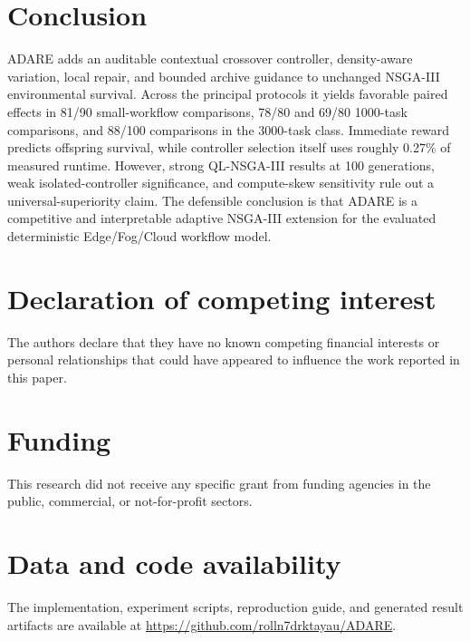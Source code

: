 \documentclass[preprint,12pt]{elsarticle}
\begin{document}
\section{Conclusion}
ADARE adds an auditable contextual crossover controller, density-aware variation, local repair, and bounded archive guidance to unchanged NSGA-III environmental survival. Across the principal protocols it yields favorable paired effects in 81/90 small-workflow comparisons, 78/80 and 69/80 1000-task comparisons, and 88/100 comparisons in the 3000-task class. Immediate reward predicts offspring survival, while controller selection itself uses roughly 0.27\% of measured runtime. However, strong QL-NSGA-III results at 100 generations, weak isolated-controller significance, and compute-skew sensitivity rule out a universal-superiority claim. The defensible conclusion is that ADARE is a competitive and interpretable adaptive NSGA-III extension for the evaluated deterministic Edge/Fog/Cloud workflow model.

\section*{Declaration of competing interest}
The authors declare that they have no known competing financial interests or personal relationships that could have appeared to influence the work reported in this paper.

\section*{Funding}
This research did not receive any specific grant from funding agencies in the public, commercial, or not-for-profit sectors.

\section*{Data and code availability}
The implementation, experiment scripts, reproduction guide, and generated result artifacts are available at \url{https://github.com/rolln7drktayau/ADARE}.
\end{document}
